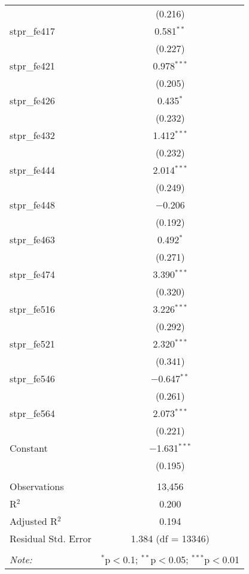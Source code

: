 \begin{table}[!htbp]
\begin{tabular}{@{\extracolsep{5pt}}lc}
  & (0.216) \\ 
  stpr\_fe417 & 0.581$^{**}$ \\ 
  & (0.227) \\ 
  stpr\_fe421 & 0.978$^{***}$ \\ 
  & (0.205) \\ 
  stpr\_fe426 & 0.435$^{*}$ \\ 
  & (0.232) \\ 
  stpr\_fe432 & 1.412$^{***}$ \\ 
  & (0.232) \\ 
  stpr\_fe444 & 2.014$^{***}$ \\ 
  & (0.249) \\ 
  stpr\_fe448 & $-$0.206 \\ 
  & (0.192) \\ 
  stpr\_fe463 & 0.492$^{*}$ \\ 
  & (0.271) \\ 
  stpr\_fe474 & 3.390$^{***}$ \\ 
  & (0.320) \\ 
  stpr\_fe516 & 3.226$^{***}$ \\ 
  & (0.292) \\ 
  stpr\_fe521 & 2.320$^{***}$ \\ 
  & (0.341) \\ 
  stpr\_fe546 & $-$0.647$^{**}$ \\ 
  & (0.261) \\ 
  stpr\_fe564 & 2.073$^{***}$ \\ 
  & (0.221) \\ 
  Constant & $-$1.631$^{***}$ \\ 
  & (0.195) \\ 
 \hline \\[-1.8ex] 
Observations & 13,456 \\ 
R$^{2}$ & 0.200 \\ 
Adjusted R$^{2}$ & 0.194 \\ 
Residual Std. Error & 1.384 (df = 13346) \\ 
\hline 
\hline \\[-1.8ex] 
\textit{Note:}  & \multicolumn{1}{r}{$^{*}$p$<$0.1; $^{**}$p$<$0.05; $^{***}$p$<$0.01} \\ 
\end{tabular} 
\end{table} 
